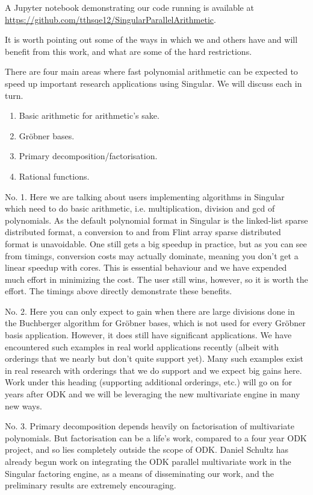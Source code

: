 \documentclass{deliverablereport}
\begin{document}
A Jupyter notebook demonstrating our code running is available at \url{https://github.com/tthsqe12/SingularParallelArithmetic}.

It is worth pointing out some of the ways in which we and others have and will benefit from this work, and what are some of the hard restrictions.

There are four main areas where fast polynomial arithmetic can be expected to speed up important research applications using Singular. We will discuss each in turn.

\begin{enumerate}
\item Basic arithmetic for arithmetic's sake.
\item Gr\"{o}bner bases.
\item Primary decomposition/factorisation.
\item Rational functions.
\end{enumerate}

No. 1. Here we are talking about users implementing algorithms in Singular which need to do basic arithmetic, i.e. multiplication, division and gcd of polynomials. As the default polynomial format in Singular is the linked-list sparse distributed format, a conversion to and from Flint array sparse distributed format is unavoidable. One still gets a big speedup in practice, but as you can see from timings, conversion costs may actually dominate, meaning you don't get a linear speedup with cores. This is essential behaviour and we have expended much effort in minimizing the cost. The user still wins, however, so it is worth the effort. The timings above directly demonstrate these benefits.

No. 2. Here you can only expect to gain when there are large divisions done in the Buchberger algorithm for Gr\"{o}bner bases, which is not used for every Gr\"{o}bner basis application. However, it does still have significant applications. We have encountered such examples in real world applications recently (albeit with orderings that we nearly but don't quite support yet). Many such examples exist in real research with orderings that we do support and we expect big gains here. Work under this heading (supporting additional orderings, etc.) will go on for years after ODK and we will be leveraging the new multivariate engine in many new ways.

No. 3. Primary decomposition depends heavily on factorisation of multivariate polynomials. But factorisation can be a life's work, compared to a four year ODK project, and so lies completely outside the scope of ODK. Daniel Schultz has already begun work on integrating the ODK parallel multivariate work in the Singular factoring engine, as a means of disseminating our work, and the preliminary results are extremely encouraging.
\end{document}
